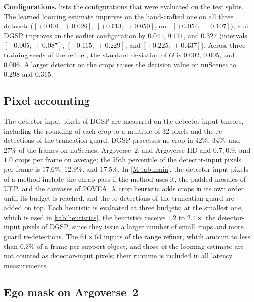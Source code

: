 \documentclass[10pt,letterpaper]{article}
\newcommand{\method}{DGSP\xspace}
\newcommand{\G}{G}
\newcommand{\ci}[2]{[#1,\allowbreak\,#2]}
\theoremstyle{remark}
\theoremstyle{plain}
\theoremstyle{definition}
\begin{document}
\noindent\textbf{Configurations.}
 lists the configurations that were evaluated on the test splits.
The learned looming estimate improves on the hand-crafted one on all three datasets ($\ci{+0.004}{+0.026}$, $\ci{+0.013}{+0.050}$, and $\ci{+0.054}{+0.107}$), and \method improves on the earlier configuration by $0.041$, $0.171$, and $0.327$ (intervals $\ci{-0.005}{+0.087}$, $\ci{+0.115}{+0.229}$, and $\ci{+0.225}{+0.437}$).
Across three training seeds of the refiner, the standard deviation of $\G$ is $0.002$, $0.005$, and $0.006$.
A larger detector on the crops raises the decision value on nuScenes to $0.298$ and $0.315$.

\subsection{Pixel accounting}
\label{sec:supp_pixels}

The detector-input pixels of \method are measured on the detector input tensors, including the rounding of each crop to a multiple of 32 pixels and the re-detections of the truncation guard.
\method processes no crop in $42\%$, $34\%$, and $27\%$ of the frames on nuScenes, Argoverse~2, and Argoverse-HD and $0.7$, $0.9$, and $1.0$ crops per frame on average; the $95$th percentile of the detector-input pixels per frame is $17.6\%$, $12.9\%$, and $17.5\%$.
In \cref*{M-tab:main}, the detector-input pixels of a method include the cheap pass if the method uses it, the padded mosaics of UFP, and the canvases of FOVEA.
A crop heuristic adds crops in its own order until its budget is reached, and the re-detections of the truncation guard are added on top.
Each heuristic is evaluated at three budgets; at the smallest one, which is used in \cref{tab:heuristics}, the heuristics receive $1.2$ to $2.4\times$ the detector-input pixels of \method, since they issue a larger number of small crops and more guard re-detections.
The $64\times64$ inputs of the range refiner, which amount to less than $0.3\%$ of a frame per support object, and those of the looming estimate are not counted as detector-input pixels; their runtime is included in all latency measurements.

\subsection{Ego mask on Argoverse~2}
\label{sec:supp_hood}
\end{document}
